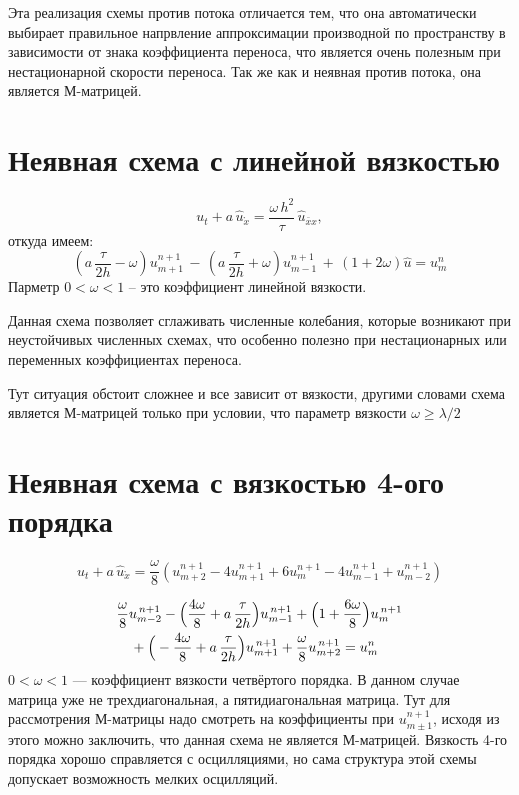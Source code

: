 \documentclass[a4paper,14pt]{extreport}
\begin{document}
Эта реализация схемы против потока отличается тем, что она автоматически выбирает правильное напрвление аппроксимации производной по пространству в зависимости от знака коэффициента переноса, что является очень полезным при нестационарной скорости переноса. Так же как и неявная против потока, она является М-матрицей.

\section*{Неявная схема с линейной вязкостью}

\begin{equation}
	u_t + a\,\hat{u}_{\mathring{x}} = \frac{\omega\,h^2}{\tau}\,\hat{u}_{\bar{x}x},
\end{equation}
откуда имеем:
\begin{equation*}
	\left(a\,\frac{\tau}{2h} - \omega\right)u_{m+1}^{n+1}\,
	-\,\left(a\,\frac{\tau}{2h} + \omega\right)u_{m-1}^{n+1}\,
	+\,(1+2\omega)\hat{u} = u_m^n
\end{equation*}
Парметр \(0 < \omega < 1\) -- это коэффициент линейной вязкости.

Данная схема позволяет сглаживать численные колебания, которые возникают при неустойчивых численных схемах, что особенно полезно при нестационарных или переменных коэффициентах переноса. 

Тут ситуация обстоит сложнее и все зависит от вязкости, другими словами схема является М-матрицей только при условии, что параметр вязкости $\omega \geq \lambda / 2$

\section*{Неявная схема с вязкостью 4-ого порядка}

\begin{equation}
	u_t + a\,\hat{u}_{\mathring{x}} = \frac{\omega}{8}\left(u_{m+2}^{n+1} - 4u_{m+1}^{n+1} 
	+ 6u_m^{n+1} - 4u_{m-1}^{n+1} + u_{m-2}^{n+1} \right)
\end{equation}

\begin{align*}
	& 
	\frac{\omega}{8} u_{m-2}^{\,n+1} 
	- \Big(\frac{4\omega}{8} + a\,\frac{\tau}{2h} \Big) u_{m-1}^{\,n+1} 
	+ \Big(1 + \frac{6\omega}{8}\Big) u_m^{\,n+1} \notag\\
	&\quad + \Big(- \frac{4\omega}{8} + a\,\frac{\tau}{2h} \Big) u_{m+1}^{\,n+1} 
	+ \frac{\omega}{8} u_{m+2}^{\,n+1} = u_m^n 
\end{align*}
\(0 < \omega < 1\) — коэффициент вязкости четвёртого порядка.  
В данном случае матрица уже не трехдиагональная, а пятидиагональная матрица. Тут для рассмотрения М-матрицы надо смотреть на коэффициенты при $u_{m±1}^{n+1}$, исходя из этого можно заключить, что данная схема не является М-матрицей. Вязкость 4-го порядка хорошо справляется с осцилляциями, но сама структура этой схемы допускает возможность мелких осцилляций.
\end{document}
